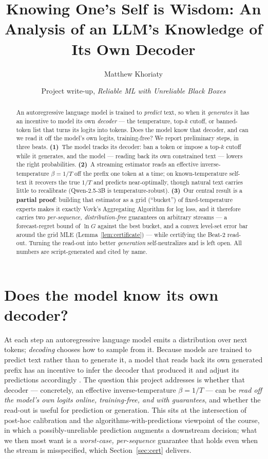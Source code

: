 \documentclass[11pt]{article}
\title{Knowing One's Self is Wisdom: An Analysis of an LLM's Knowledge of Its Own Decoder}
\author{Matthew Khoriaty}
\date{Project write-up, \emph{Reliable ML with Unreliable Black Boxes}}
\begin{document}
\maketitle

\begin{abstract}
An autoregressive language model is trained to \emph{predict} text, so when it
\emph{generates} it has an incentive to model its own \emph{decoder} --- the
temperature, top-$k$ cutoff, or banned-token list that turns its logits into
tokens. Does the model know that decoder, and can we read it off the model's own
logits, training-free? We report preliminary steps, in three beats.
\textbf{(1)}~The model tracks its decoder: ban a token or impose a top-$k$ cutoff
while it generates, and the model --- reading back its own constrained text ---
lowers the right probabilities. \textbf{(2)}~A streaming estimator reads an
effective inverse-temperature $\beta = 1/T$ off the prefix one token at a time;
on known-temperature self-text it recovers the true $1/T$ and predicts
near-optimally, though natural text carries little to recalibrate (Qwen-2.5-3B is
temperature-robust). \textbf{(3)}~Our central result is a \textbf{partial proof}:
building that estimator as a grid (``bucket'') of fixed-temperature experts makes
it exactly Vovk's Aggregating Algorithm for log loss, and it therefore carries
two \emph{per-sequence, distribution-free} guarantees on arbitrary streams --- a
forecast-regret bound of $\ln G$ against the best bucket, and a convex level-set
error bar around the grid MLE (Lemma~\ref{lem:certificate}) --- while certifying
the Beat-2 read-out. Turning the read-out into better \emph{generation}
self-neutralizes and is left open. All numbers are script-generated and cited by
name.
\end{abstract}

\section{Does the model know its own decoder?}\label{sec:know}
At each step an autoregressive language model emits a distribution over next
tokens; \emph{decoding} chooses how to sample from it.
Because models are trained to predict text rather than to generate it, a model
that reads back its own generated prefix has an incentive to infer the decoder
that produced it and adjust its predictions accordingly \citep{basu2021mirostat}.
The question this project addresses is whether that decoder --- concretely, an
effective inverse-temperature $\beta = 1/T$ --- can be \emph{read off the model's
own logits online, training-free, and with guarantees}, and whether the read-out
is useful for prediction or generation.
This sits at the intersection of post-hoc calibration
\citep{guo2017calibration,liu2024temperature} and the
algorithms-with-predictions viewpoint \citep{mitzenmacher2020algorithms} of the
course, in which a possibly-unreliable prediction augments a downstream decision;
what we then most want is a \emph{worst-case, per-sequence} guarantee that holds
even when the stream is misspecified, which Section~\ref{sec:cert} delivers.
\end{document}
